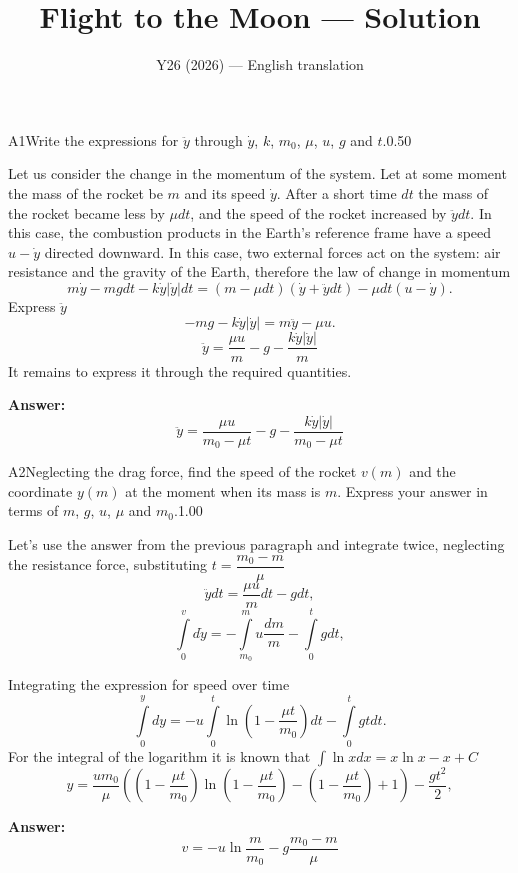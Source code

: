 \documentclass[11pt,a4paper]{article}
\title{\textbf{Flight to the Moon --- Solution}}
\author{\normalsize Y26 (2026) — English translation}
\date{}
\begin{document}
\maketitle\vspace{-0.5em}
\begin{solcard}{A1}{Write the expressions for $\ddot y$ through $\dot{y}$, $k$, $m_0$, $\mu$, $u$, $g$ and $t$.}{0.50}

Let us consider the change in the momentum of the system. Let at some moment the mass of the rocket be $m$ and its speed $\dot y$. After a short time $dt$ the mass of the rocket became less by $\mu dt$, and the speed of the rocket increased by $\ddot y dt$. In this case, the combustion products in the Earth’s reference frame have a speed $u-\dot y$ directed downward. In this case, two external forces act on the system: air resistance and the gravity of the Earth, therefore the law of change in momentum $$m\dot y -mgdt-k\dot y\left|\dot y\right|dt= (m-\mu dt)(\dot y + \ddot y dt) - \mu dt(u-\dot y).$$Express $\ddot y$ $$-mg-k\dot y \left|\dot y\right| = m\ddot y - \mu u.$$$$\ddot y = \frac{\mu u}{m}-g-\frac{k\dot y \left|\dot y\right|}{m}$$It remains to express it through the required quantities.

\par\smallskip\noindent\textbf{Answer:} $$\ddot y = \frac{\mu u}{m_0-\mu t}-g-\frac{k\dot y \left|\dot y\right|}{m_0-\mu t}$$
\end{solcard}

\begin{solcard}{A2}{Neglecting the drag force, find the speed of the rocket $v(m)$ and the coordinate $y(m)$ at the moment when its mass is $m$. Express your answer in terms of $m$, $g$, $u$, $\mu$ and $m_0$.}{1.00}

Let's use the answer from the previous paragraph and integrate twice, neglecting the resistance force, substituting $t=\dfrac{m_0-m}{\mu}$ $$\ddot y dt=\dfrac{\mu u}{m} dt-g dt,$$$$\int\limits_0^v d\dot y =- \int\limits_{m_0}^m u\dfrac{dm}{m} - \int\limits_0^t g dt,$$


Integrating the expression for speed over time $$\int \limits_0^y dy=-u\int \limits_0^t \ln{\left(1-\dfrac{\mu t}{m_0}\right) dt} -\int \limits_0^t gt dt.$$For the integral of the logarithm it is known that $\int \ln{x}dx=x\ln{x}-x+C$ $$y=\dfrac{um_0}{\mu}\left(\left(1-\dfrac{\mu t}{m_0}\right)\ln{\left(1-\dfrac{\mu t}{m_0}\right)} - \left(1-\dfrac{\mu t}{m_0}\right)+1\right)-\dfrac{gt^2}{2},$$

\par\smallskip\noindent\textbf{Answer:} $$v=-u\ln{\dfrac{m}{m_0}}-g\dfrac{m_0-m}{\mu}$$
\end{solcard}
\end{document}
